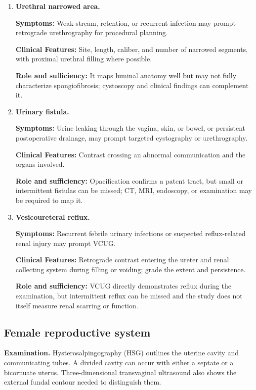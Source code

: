 \begin{enumerate}[leftmargin=*,itemsep=0.45em,topsep=0.4em]
\item \textbf{Urethral narrowed area.}\par\noindent\textbf{Symptoms:} Weak stream, retention, or recurrent infection may prompt retrograde urethrography for procedural planning.\par\noindent\textbf{Clinical Features:} Site, length, caliber, and number of narrowed segments, with proximal urethral filling where possible.\par\noindent\textbf{Role and sufficiency:} It maps luminal anatomy well but may not fully characterize spongiofibrosis; cystoscopy and clinical findings can complement it.
\item \textbf{Urinary fistula.}\par\noindent\textbf{Symptoms:} Urine leaking through the vagina, skin, or bowel, or persistent postoperative drainage, may prompt targeted cystography or urethrography.\par\noindent\textbf{Clinical Features:} Contrast crossing an abnormal communication and the organs involved.\par\noindent\textbf{Role and sufficiency:} Opacification confirms a patent tract, but small or intermittent fistulas can be missed; CT, MRI, endoscopy, or examination may be required to map it.
\item \textbf{Vesicoureteral reflux.}\par\noindent\textbf{Symptoms:} Recurrent febrile urinary infections or suspected reflux-related renal injury may prompt VCUG.\par\noindent\textbf{Clinical Features:} Retrograde contrast entering the ureter and renal collecting system during filling or voiding; grade the extent and persistence.\par\noindent\textbf{Role and sufficiency:} VCUG directly demonstrates reflux during the examination, but intermittent reflux can be missed and the study does not itself measure renal scarring or function.
\end{enumerate}

\subsection{Female reproductive system}
\textbf{Examination.} Hysterosalpingography (HSG) outlines the uterine cavity and communicating tubes. A divided cavity can occur with either a septate or a bicornuate uterus. Three-dimensional transvaginal ultrasound also shows the external fundal contour needed to distinguish them.

